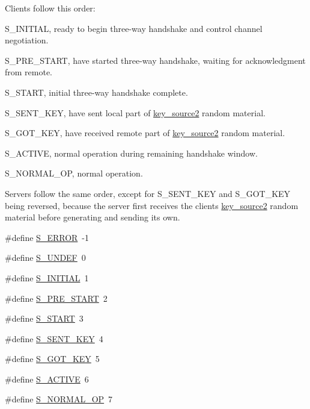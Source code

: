 Clients follow this order\+:
\begin{DoxyEnumerate}
\item {\ttfamily S\+\_\+\+I\+N\+I\+T\+I\+A\+L}, ready to begin three-\/way handshake and control channel negotiation.
\item {\ttfamily S\+\_\+\+P\+R\+E\+\_\+\+S\+T\+A\+R\+T}, have started three-\/way handshake, waiting for acknowledgment from remote.
\item {\ttfamily S\+\_\+\+S\+T\+A\+R\+T}, initial three-\/way handshake complete.
\item {\ttfamily S\+\_\+\+S\+E\+N\+T\+\_\+\+K\+E\+Y}, have sent local part of {\ttfamily \hyperlink{structkey__source2}{key\+\_\+source2}} random material.
\item {\ttfamily S\+\_\+\+G\+O\+T\+\_\+\+K\+E\+Y}, have received remote part of {\ttfamily \hyperlink{structkey__source2}{key\+\_\+source2}} random material.
\item {\ttfamily S\+\_\+\+A\+C\+T\+I\+V\+E}, normal operation during remaining handshake window.
\item {\ttfamily S\+\_\+\+N\+O\+R\+M\+A\+L\+\_\+\+O\+P}, normal operation.
\end{DoxyEnumerate}

Servers follow the same order, except for {\ttfamily S\+\_\+\+S\+E\+N\+T\+\_\+\+K\+E\+Y} and {\ttfamily S\+\_\+\+G\+O\+T\+\_\+\+K\+E\+Y} being reversed, because the server first receives the client\textquotesingle{}s {\ttfamily \hyperlink{structkey__source2}{key\+\_\+source2}} random material before generating and sending its own. \begin{DoxyCompactItemize}
\item 
\#define \hyperlink{group__control__processor_gaf6e8cab5d0642b96ef462156816c3a28}{S\+\_\+\+E\+R\+R\+O\+R}~-\/1
\item 
\#define \hyperlink{group__control__processor_ga5c620f0ab83a389abc17d80bfb1e0665}{S\+\_\+\+U\+N\+D\+E\+F}~0
\item 
\#define \hyperlink{group__control__processor_gaf80d9f1dca21e561e35220bdeee2fc1e}{S\+\_\+\+I\+N\+I\+T\+I\+A\+L}~1
\item 
\#define \hyperlink{group__control__processor_ga6be8de96f4d931c3be923f74f8511b02}{S\+\_\+\+P\+R\+E\+\_\+\+S\+T\+A\+R\+T}~2
\item 
\#define \hyperlink{group__control__processor_ga66275a3888e8a86da79d69078c27c18d}{S\+\_\+\+S\+T\+A\+R\+T}~3
\item 
\#define \hyperlink{group__control__processor_gadf3421bc4c6c95c3ed9824fe7c2c20d8}{S\+\_\+\+S\+E\+N\+T\+\_\+\+K\+E\+Y}~4
\item 
\#define \hyperlink{group__control__processor_ga66bd0f7cdbc8450a4690c519de7d75bc}{S\+\_\+\+G\+O\+T\+\_\+\+K\+E\+Y}~5
\item 
\#define \hyperlink{group__control__processor_ga0b9dd6c70b47159cdbfbeecb4b971197}{S\+\_\+\+A\+C\+T\+I\+V\+E}~6
\item 
\#define \hyperlink{group__control__processor_gaa92fb79464b68ac009946bd9cc9b8d89}{S\+\_\+\+N\+O\+R\+M\+A\+L\+\_\+\+O\+P}~7
\end{DoxyCompactItemize}
